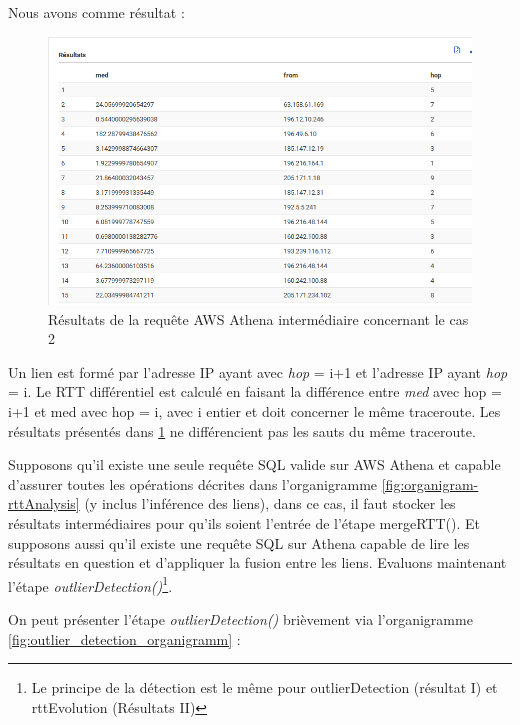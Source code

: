 Nous avons comme résultat :

\begin{figure}[H]
\centering
\includegraphics[width=1\linewidth]{illustrations/data_request}
\caption{Résultats de la requête AWS Athena intermédiaire concernant le cas 2}
\label{fig:data_request}
\end{figure}

Un lien est formé par l'adresse IP ayant avec \textit{hop} = i+1 et l'adresse IP ayant \textit{hop} = i. Le RTT différentiel est calculé en faisant la différence entre \textit{med} avec hop = i+1 et med avec hop = i, avec i   entier et doit concerner le même traceroute. Les résultats présentés dans \ref{fig:data_request} ne différencient pas les sauts du même traceroute.


Supposons qu'il existe une seule requête SQL valide sur AWS Athena et capable d'assurer toutes les opérations décrites dans l'organigramme \ref{fig:organigram-rttAnalysis} (y inclus l'inférence des liens), dans ce cas, il faut stocker les résultats intermédiaires pour qu'ils soient l'entrée de l'étape mergeRTT(). Et supposons aussi qu'il existe une requête SQL sur Athena capable de lire les résultats en question et d'appliquer la fusion entre les liens. Evaluons maintenant l'étape \textit{outlierDetection()}\footnote{Le principe de la détection est le même pour outlierDetection (résultat I) et rttEvolution (Résultats II)}. 


 On peut présenter  l'étape \textit{outlierDetection()} brièvement via l'organigramme  \ref{fig:outlier_detection_organigramm} :
 
